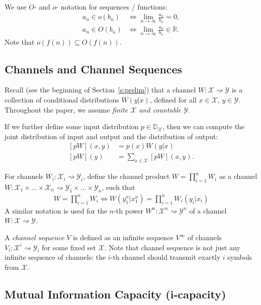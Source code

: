 \documentclass[journal, twocol]{IEEEtran}
\newcommand{\bD}{{\mathbb{D}}}
\newcommand{\bR}{{\mathbb{R}}}
\newcommand{\mX}{{\mathcal{X}}}
\newcommand{\mY}{{\mathcal{Y}}}
\newcommand{\tosq}{\rightsquigarrow}
\newcommand{\pWd}[2]{[{#1}{#2}]}
\newcommand{\pWyd}[2]{[{#1}{#2}]}
\begin{document}
We use $O$- and $o$- notation for sequences / functions:
\begin{align}
a_n\in o(b_n) &\iff \lim_{n\to\infty}\frac{a_n}{b_n}=0,
\\
a_n\in O(b_n) &\iff \lim_{n\to\infty}\frac{a_n}{b_n}\in\bR.
\end{align}
Note that $o(f(n)) \subseteq O(f(n))$.

\subsection{Channels and Channel Sequences \label{s:chseq}}

Recall (see the beginning of Section~\ref{s:prelim}) that a channel $W:\mX\tosq\mY$ is a collection of conditional distributions $W(y|x)$, defined for all $x\in\mX$, $y\in\mY$.
Throughout the paper, we assume \emph{finite $\mX$ and countable $\mY$}.

If we further define some input distribution $p\in\bD_\mX$, then we can compute the joint distribution of input and output and the distribution of output:
\begin{subequations}
\begin{align}
\pWd{p}{W}(x,y)&=p(x)W(y|x)
\label{eq:pWxy}
\\
\pWyd{p}{W}(y)&=\sum_{x\in\mX}\pWd{p}{W}(x,y).
\label{eq:pWy}
\end{align}
\end{subequations}

For channels $W_i:\mX_i\tosq\mY_i$, define the channel product $W=\prod_{i=1}^n W_i$ as a channel $W:\mX_1\times\dots\times\mX_n\tosq\mY_1\times\dots\times\mY_n$, such that
\begin{align}
W=\prod_{i=1}^n W_i \iff W(y_1^n|x_1^n)=\prod_{i=1}^n W_i(y_i|x_i) 
\label{eq:prodW}
\end{align}
A similar notation is used for the $n$-th power $W^n:\mX^n\tosq\mY^n$ of a channel $W:\mX\tosq\mY$.

A \emph{channel sequence} $V$ is defined as an infinite sequence $V^\infty$ of channels $V_i:\mX^i\tosq\mY_i$ for some fixed set $\mX$.
Note that channel sequence is not just any infinite sequence of channels: the $i$-th channel should transmit exactly $i$ symbols from $\mX$.

\subsection{Mutual Information Capacity (i-capacity)}
\end{document}
